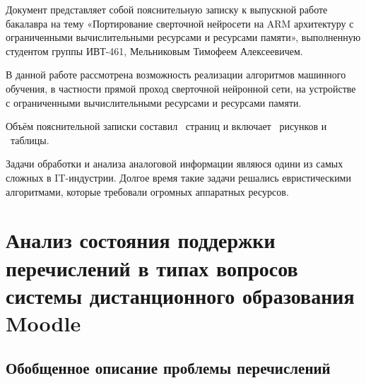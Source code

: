 \documentclass[a4paper,english,russian]{G2-105}
\begin{document}
\VSTUSetFacilityExpert{}{}{}{}
\VSTUInitializePZ
{}
\par Документ представляет собой пояснительную записку к выпускной работе бакалавра на тему «Портирование сверточной нейросети на ARM архитектуру с ограниченными вычислительными ресурсами и ресурсами памяти», выполненную студентом группы ИВТ-461, Мельниковым Тимофеем Алексеевичем.
\par В данной работе рассмотрена возможность реализации алгоритмов машинного обучения, в частности прямой проход сверточной нейронной сети, на устройстве с ограниченными вычислительными ресурсами и ресурсами памяти.
\par Объём пояснительной записки составил \totalpages~страниц и включает \totalfigures~рисунков и \totaltables~таблицы. 

\tableofcontents
\newpage

\par Задачи обработки и анализа аналоговой информации являюся одини из самых сложных в IT-индустрии. Долгое
время такие задачи решались евристическими алгоритмами, которые требовали огромных аппаратных ресурсов.
\newpage

\chapter{Анализ состояния поддержки перечислений в типах вопросов системы дистанционного образования Moodle}
\ttl
\section{Обобщенное описание проблемы перечислений}
\end{document}
